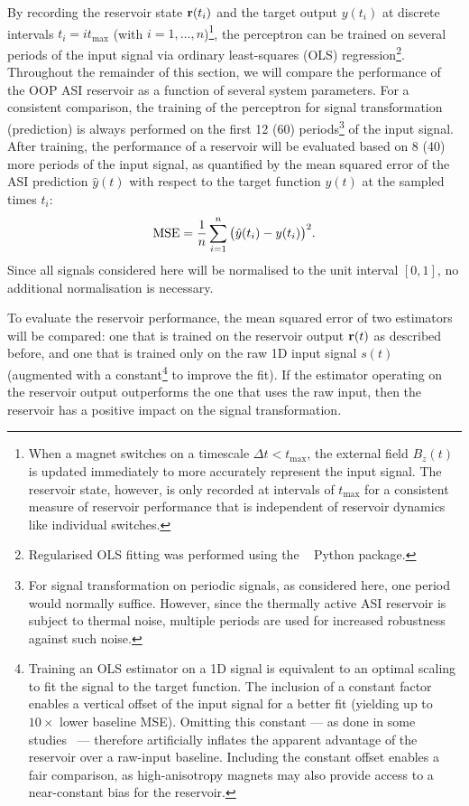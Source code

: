 By recording the reservoir state $\boldsymbol{\mathbf{r}}(t_i)$ and the target output $y(t_i)$ at discrete intervals $t_i = i t_\mathrm{max}$ (with $i = 1,\dots,n$)\footnote{
	When a magnet switches on a timescale $\Delta t < t_\mathrm{max}$, the external field $B_z(t)$ is updated immediately to more accurately represent the input signal.
	The reservoir state, however, is only recorded at intervals of $t_\mathrm{max}$ for a consistent measure of reservoir performance that is independent of reservoir dynamics like individual switches.
}, the perceptron can be trained on several periods of the input signal via ordinary least-squares (OLS) regression\footnote{
	Regularised OLS fitting was performed using the ~\cite{statsmodels} Python package.
}.
Throughout the remainder of this section, we will compare the performance of the OOP ASI reservoir as a function of several system parameters.
For a consistent comparison, the training of the perceptron for signal transformation (prediction) is always performed on the first 12 (60) periods\footnote{
	For signal transformation on periodic signals, as considered here, one period would normally suffice.
	However, since the thermally active ASI reservoir is subject to thermal noise, multiple periods are used for increased robustness against such noise.
} of the input signal.
After training, the performance of a reservoir will be evaluated based on 8 (40) more periods of the input signal, as quantified by the mean squared error of the ASI prediction $\hat{y}(t)$ with respect to the target function $y(t)$ at the sampled times $t_i$:
\begin{equation}
	\label{eq:3:MSE}
	\mathrm{MSE} = \frac{1}{n} \sum_{i=1}^n \big(\hat{y}(t_i) - y(t_i)\big)^2 \mathrm{.}
\end{equation}
Since all signals considered here will be normalised to the unit interval $[0,1]$, no additional normalisation is necessary. \par
To evaluate the reservoir performance, the mean squared error of two estimators will be compared: one that is trained on the reservoir output $\boldsymbol{\mathbf{r}}(t)$ as described before, and one that is trained only on the raw 1D input signal $s(t)$ (augmented with a constant\footnote{
	Training an OLS estimator on a 1D signal is equivalent to an optimal scaling to fit the signal to the target function.
	The inclusion of a constant factor enables a vertical offset of the input signal for a better fit (yielding up to $10 \times$ lower baseline MSE).
	Omitting this constant --- as done in some studies~\cite{gartside2022reconfigurable} --- therefore artificially inflates the apparent advantage of the reservoir over a raw-input baseline.
	Including the constant offset enables a fair comparison, as high-anisotropy magnets may also provide access to a near-constant bias for the reservoir.
} to improve the fit).
If the estimator operating on the reservoir output outperforms the one that uses the raw input, then the reservoir has a positive impact on the signal transformation.

